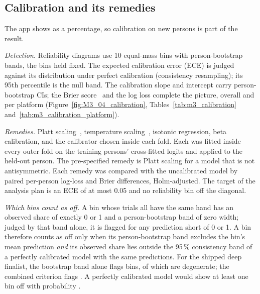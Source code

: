 
\subsection{Calibration and its remedies}\label{app:m3:calibration}

The app shows \pright{} as a percentage, so calibration on new persons is part of the result.

\emph{Detection.} Reliability diagrams use 10 equal-mass bins with person-bootstrap bands, the bins held fixed.
The expected calibration error (ECE) is judged against its distribution under perfect calibration (consistency resampling); its 95th percentile is the null band.
The calibration slope and intercept carry person-bootstrap CIs; the Brier score~\cite{brier1950verification} and the log loss complete the picture, overall and per platform (Figure~\ref{fig:M3_04_calibration}, Tables~\ref{tab:m3_calibration} and~\ref{tab:m3_calibration_platform}).

\emph{Remedies.} Platt scaling~\cite{platt1999probabilistic}, temperature scaling~\cite{guo2017calibration}, isotonic regression, beta calibration, and the calibrator chosen inside each fold.
Each was fitted inside every outer fold on the training persons' cross-fitted logits and applied to the held-out person.
The pre-specified remedy is Platt scaling for a model that is not antisymmetric.
Each remedy was compared with the uncalibrated model by paired per-person log-loss and Brier differences, Holm-adjusted.
The target of the analysis plan is an ECE of at most 0.05 and no reliability bin off the diagonal.

\emph{Which bins count as off.} A bin whose trials all have the same hand has an observed share of exactly 0 or 1 and a person-bootstrap band of zero width; judged by that band alone, it is flagged for any prediction short of 0 or 1.
A bin therefore counts as off only when its person-bootstrap band excludes the bin's mean prediction \emph{and} its observed share lies outside the 95\,\% consistency band of a perfectly calibrated model with the same predictions.
For the shipped deep finalist, the bootstrap band alone flags  bins, of which  are degenerate; the combined criterion flags .
A perfectly calibrated model would show at least one bin off with probability .

